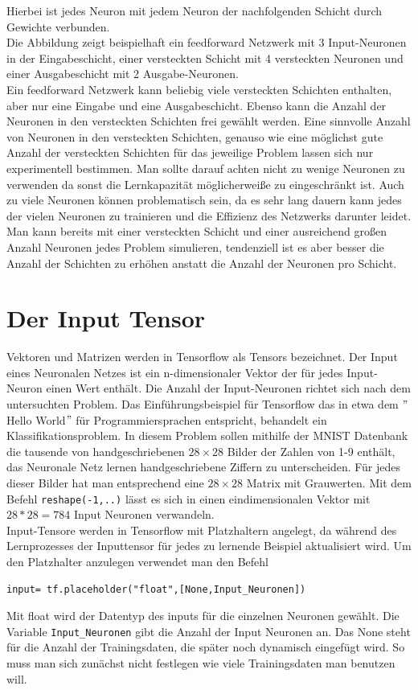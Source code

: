 Hierbei ist jedes Neuron mit jedem Neuron der nachfolgenden Schicht durch Gewichte verbunden.\\
Die Abbildung zeigt beispielhaft ein feedforward Netzwerk mit 3 Input-Neuronen in der Eingabeschicht, einer versteckten Schicht mit 4 versteckten Neuronen und einer Ausgabeschicht mit 2 Ausgabe-Neuronen.\cite{Bishop1995}\\
Ein feedforward Netzwerk kann beliebig viele versteckten Schichten enthalten, aber nur eine Eingabe und eine Ausgabeschicht. Ebenso kann die Anzahl der Neuronen in den versteckten Schichten frei gew\"ahlt werden. Eine sinnvolle Anzahl von Neuronen in den versteckten Schichten, genauso wie eine möglichst gute Anzahl der versteckten Schichten für das jeweilige Problem lassen sich nur experimentell bestimmen.\cite{handson} Man sollte darauf achten nicht zu wenige Neuronen zu verwenden da sonst die Lernkapazit\"at möglicherwei\ss e zu eingeschränkt ist. Auch zu viele Neuronen können problematisch sein, da es sehr lang dauern kann jedes der vielen Neuronen zu trainieren und die Effizienz des Netzwerks darunter leidet.\cite{Rashid} \\ Man kann bereits mit einer versteckten Schicht und einer ausreichend gro\ss en Anzahl Neuronen jedes Problem simulieren, tendenziell ist es aber besser die Anzahl der Schichten zu erhöhen anstatt die Anzahl der Neuronen pro Schicht.\cite{handson} 
\section{Der Input Tensor}
Vektoren und Matrizen werden in Tensorflow als Tensors bezeichnet. Der Input eines Neuronalen Netzes ist ein n-dimensionaler Vektor der für jedes Input-Neuron einen Wert enthält. Die Anzahl der Input-Neuronen richtet sich nach dem untersuchten Problem. Das Einführungsbeispiel für Tensorflow das in etwa dem $"$Hello World$"$ f\"ur Programmiersprachen entspricht, behandelt ein Klassifikationsproblem.\cite{handson} In diesem Problem sollen mithilfe der MNIST Datenbank die tausende von handgeschriebenen $28 \times 28$ Bilder der Zahlen von 1-9 enthält, das Neuronale Netz lernen handgeschriebene Ziffern zu unterscheiden. Für jedes dieser Bilder hat man entsprechend eine $28 \times 28$ Matrix mit Grauwerten. Mit dem Befehl \lstinline$reshape(-1,..)$ \cite{handson} lässt es sich in einen eindimensionalen Vektor mit  $28*28=784$ Input Neuronen verwandeln.\\
Input-Tensore werden in Tensorflow mit Platzhaltern angelegt, da während des Lernprozesses der Inputtensor für jedes zu lernende Beispiel aktualisiert wird. Um den Platzhalter anzulegen verwendet man den Befehl\cite{cookbook}
\begin{lstlisting}
input= tf.placeholder("float",[None,Input_Neuronen])
\end{lstlisting}
Mit float wird der Datentyp des inputs für die einzelnen Neuronen gewählt. Die Variable \lstinline$Input_Neuronen$ gibt die Anzahl der Input Neuronen an. Das None steht f\"ur die Anzahl der Trainingsdaten, die später noch dynamisch eingefügt wird. So muss man sich zunächst nicht festlegen wie viele Trainingsdaten man benutzen will.\cite{handson} 

